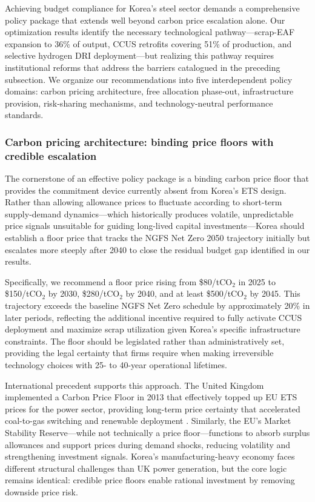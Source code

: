 \documentclass[preprint,1p,authoryear]{elsarticle}
\begin{document}
Achieving budget compliance for Korea's steel sector demands a comprehensive policy package that extends well beyond carbon price escalation alone. Our optimization results identify the necessary technological pathway—scrap-EAF expansion to 36\% of output, CCUS retrofits covering 51\% of production, and selective hydrogen DRI deployment—but realizing this pathway requires institutional reforms that address the barriers catalogued in the preceding subsection. We organize our recommendations into five interdependent policy domains: carbon pricing architecture, free allocation phase-out, infrastructure provision, risk-sharing mechanisms, and technology-neutral performance standards.

\subsubsection{Carbon pricing architecture: binding price floors with credible escalation}

The cornerstone of an effective policy package is a binding carbon price floor that provides the commitment device currently absent from Korea's ETS design. Rather than allowing allowance prices to fluctuate according to short-term supply-demand dynamics—which historically produces volatile, unpredictable price signals unsuitable for guiding long-lived capital investments—Korea should establish a floor price that tracks the NGFS Net Zero 2050 trajectory initially but escalates more steeply after 2040 to close the residual budget gap identified in our results.

Specifically, we recommend a floor price rising from \$80/tCO$_2$ in 2025 to \$150/tCO$_2$ by 2030, \$280/tCO$_2$ by 2040, and at least \$500/tCO$_2$ by 2045. This trajectory exceeds the baseline NGFS Net Zero schedule by approximately 20\% in later periods, reflecting the additional incentive required to fully activate CCUS deployment and maximize scrap utilization given Korea's specific infrastructure constraints. The floor should be legislated rather than administratively set, providing the legal certainty that firms require when making irreversible technology choices with 25- to 40-year operational lifetimes.

International precedent supports this approach. The United Kingdom implemented a Carbon Price Floor in 2013 that effectively topped up EU ETS prices for the power sector, providing long-term price certainty that accelerated coal-to-gas switching and renewable deployment \citep{Green2021}. Similarly, the EU's Market Stability Reserve—while not technically a price floor—functions to absorb surplus allowances and support prices during demand shocks, reducing volatility and strengthening investment signals. Korea's manufacturing-heavy economy faces different structural challenges than UK power generation, but the core logic remains identical: credible price floors enable rational investment by removing downside price risk.
\end{document}
